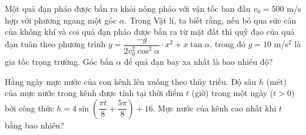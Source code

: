 \begin{ex}%
Một quả đạn pháo được bắn ra khỏi nòng pháo với vận tốc ban đầu $ v_0=500$ m/s hợp với phương ngang một góc $ \alpha $. Trong Vật lí, ta biết rằng, nếu bỏ qua sức cản của không khí và coi quả đạn pháo được bắn ra từ mặt đất thì quỹ đạo của quả đạn tuân theo phương trình $ y=\dfrac{-g}{2v_0^2\cos^2\alpha}\cdot x^2+x\tan \alpha $, trong đó $g = 10$ m/s$ ^2 $ là gia tốc trọng trường. Góc bắn $ \alpha $ để quả đạn bay xa nhất là bao nhiêu độ?
\end{ex}

\begin{ex}%
Hằng ngày mực nước của con kênh lên xuống theo thủy triều. Độ sâu $h$ (mét) của mực nước trong kênh được tính tại thời điểm $t$ (giờ) trong một ngày ($t > 0$) bởi công thức $h=4\sin (\dfrac{\pi t}{8}+\dfrac{5\pi}{8})+16$. Mực nước của kênh cao nhất khi $t$ bằng bao nhiêu?
\end{ex}

